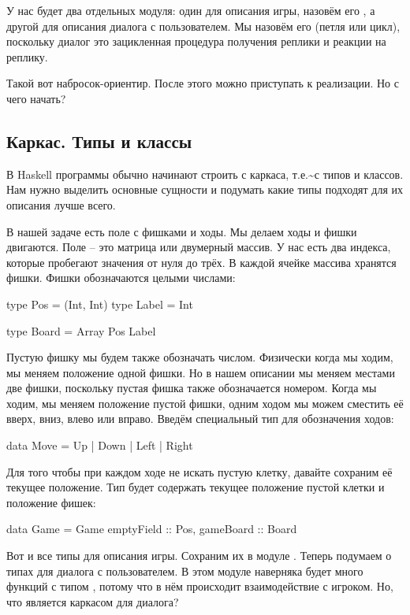 У нас будет два отдельных модуля: один для описания игры, назовём его
, а другой для описания диалога с пользователем. Мы назовём его
 (петля или цикл), поскольку диалог это зацикленная процедура
получения реплики и реакции на реплику.

Такой вот набросок-ориентир. После этого можно приступать к реализации.
Но с чего начать?

\subsection{Каркас. Типы и классы}

В Haskell программы обычно начинают строить с каркаса,
т.е.\textasciitilde{}с типов и классов. Нам нужно выделить основные
сущности и подумать какие типы подходят для их описания лучше всего.

В нашей задаче есть поле с фишками и ходы. Мы делаем ходы и фишки
двигаются. Поле -- это матрица или двумерный массив. У нас есть два
индекса, которые пробегают значения от нуля до трёх. В каждой ячейке
массива хранятся фишки. Фишки обозначаются целыми числами:


\begin{code}
type Pos    = (Int, Int)
type Label  = Int

type Board  = Array Pos Label
\end{code}

Пустую фишку мы будем также обозначать числом. Физически когда мы ходим,
мы меняем положение одной фишки. Но в нашем описании мы меняем местами
две фишки, поскольку пустая фишка также обозначается номером. Когда мы
ходим, мы меняем положение пустой фишки, одним ходом мы можем сместить
её вверх, вниз, влево или вправо. Введём специальный тип для обозначения
ходов:


\begin{code}
data Move = Up | Down | Left | Right
\end{code}

Для того чтобы при каждом ходе не искать пустую клетку, давайте сохраним
её текущее положение. Тип  будет содержать текущее положение
пустой клетки и положение фишек:


\begin{code}
data Game = Game {
        emptyField  :: Pos,
        gameBoard   :: Board }
\end{code}

Вот и все типы для описания игры. Сохраним их в модуле . Теперь
подумаем о типах для диалога с пользователем. В этом модуле наверняка
будет много функций с типом , потому что в нём происходит
взаимодействие с игроком. Но, что является каркасом для диалога?

